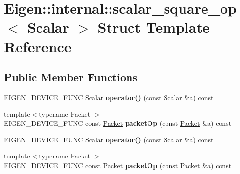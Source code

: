\hypertarget{struct_eigen_1_1internal_1_1scalar__square__op}{}\section{Eigen\+:\+:internal\+:\+:scalar\+\_\+square\+\_\+op$<$ Scalar $>$ Struct Template Reference}
\label{struct_eigen_1_1internal_1_1scalar__square__op}
\subsection*{Public Member Functions}
\begin{DoxyCompactItemize}
\item 
\mbox{\label{struct_eigen_1_1internal_1_1scalar__square__op_adc6cc27e7ed7e04a847e1de00556f971}} 
E\+I\+G\+E\+N\+\_\+\+D\+E\+V\+I\+C\+E\+\_\+\+F\+U\+NC Scalar {\bfseries operator()} (const Scalar \&a) const
\item 
\mbox{\label{struct_eigen_1_1internal_1_1scalar__square__op_ab06f4cf9058ffb23b520a1d107904ddb}} 
{\footnotesize template$<$typename Packet $>$ }\\E\+I\+G\+E\+N\+\_\+\+D\+E\+V\+I\+C\+E\+\_\+\+F\+U\+NC const \hyperlink{union_eigen_1_1internal_1_1_packet}{Packet} {\bfseries packet\+Op} (const \hyperlink{union_eigen_1_1internal_1_1_packet}{Packet} \&a) const
\item 
\mbox{\label{struct_eigen_1_1internal_1_1scalar__square__op_adc6cc27e7ed7e04a847e1de00556f971}} 
E\+I\+G\+E\+N\+\_\+\+D\+E\+V\+I\+C\+E\+\_\+\+F\+U\+NC Scalar {\bfseries operator()} (const Scalar \&a) const
\item 
\mbox{\label{struct_eigen_1_1internal_1_1scalar__square__op_ab06f4cf9058ffb23b520a1d107904ddb}} 
{\footnotesize template$<$typename Packet $>$ }\\E\+I\+G\+E\+N\+\_\+\+D\+E\+V\+I\+C\+E\+\_\+\+F\+U\+NC const \hyperlink{union_eigen_1_1internal_1_1_packet}{Packet} {\bfseries packet\+Op} (const \hyperlink{union_eigen_1_1internal_1_1_packet}{Packet} \&a) const
\end{DoxyCompactItemize}


